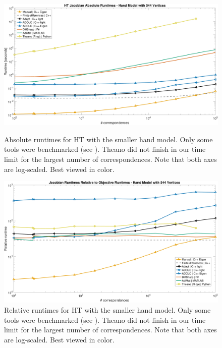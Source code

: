 \documentclass[suppldata]{article}
\begin{document}
\begin{figure}[ht]
    \includegraphics[width=\textwidth]{figs/ht-abs-small-legend}
    \caption{Absolute runtimes for HT with the smaller hand model.
  Only some tools were benchmarked (see ).
  Theano did not finish in our time limit for the largest number of correspondences. 
  Note that both axes are log-scaled. Best viewed in color.}
    \label{fig:ht-small-abs}

    \includegraphics[width=\textwidth]{figs/ht-rel-small-legend}
    \caption{Relative runtimes for HT with the smaller hand model.
  Only some tools were benchmarked (see ).
  Theano did not finish in our time limit for the largest number of correspondences. 
  Note that both axes are log-scaled. Best viewed in color.}
    \label{fig:ht-small-rel}
\end{figure}
\end{document}
